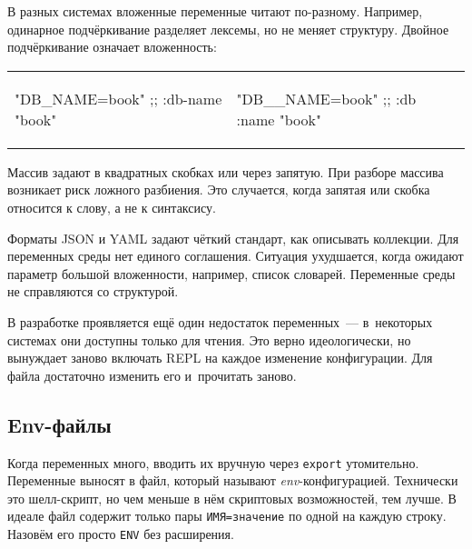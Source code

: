 В разных системах вложенные переменные читают по-разному. Например, одинарное
подчёркивание разделяет лексемы, но не меняет структуру. Двойное подчёркивание
означает вложенность:

\noindent
\begin{tabular}{ @{}p{5cm} @{}p{5cm} }

\begin{english}
  \begin{clojure}
"DB_NAME=book"
;; {:db-name "book"}
  \end{clojure}
\end{english}

&

\begin{english}
  \begin{clojure}
"DB__NAME=book"
;; {:db {:name "book"}}
  \end{clojure}
\end{english}

\end{tabular}


Массив задают в квадратных скобках или через запятую. При разборе массива
возникает риск ложного разбиения. Это случается, когда запятая или скобка
относится к слову, а не к синтаксису.


Форматы JSON и YAML задают чёткий стандарт, как описывать коллекции. Для
переменных среды нет единого соглашения. Ситуация ухудшается, когда ожидают
параметр большой вложенности, например, список словарей. Переменные среды не
справляются со структурой.

В разработке проявляется ещё один недостаток переменных~--- в~некоторых системах
они доступны только для чтения. Это верно идеологически, но вынуждает заново
включать REPL на каждое изменение конфигурации. Для файла достаточно изменить
его и~прочитать заново.

\subsection{Env-файлы}


Когда переменных много, вводить их вручную через \verb|export|
утомительно. Переменные выносят в файл, который называют
\emph{env}-кон\-фи\-гу\-ра\-цией. Технически это шелл-скрипт, но чем меньше в
нём скриптовых возможностей, тем лучше. В идеале файл содержит только пары
\verb|ИМЯ=значение| по одной на каждую строку. Назовём его просто \verb|ENV| без
расширения.

